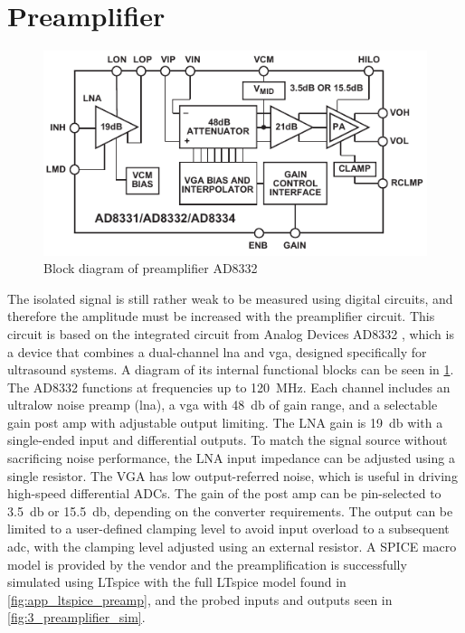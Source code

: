 \section{Preamplifier}
\begin{figure}[htbp]
	\centering
	\includegraphics[width=.8\textwidth]{Figures/3_ad8332_block.pdf}
	\caption[Block diagram of preamplifier AD8332]{Block diagram of preamplifier AD8332 \cite{AD8332}}
	\label{fig:3_preamplifier_block}
\end{figure}
The isolated signal is still rather weak to be measured using digital circuits, and therefore the amplitude must be increased with the preamplifier circuit. This circuit is based on the integrated circuit from Analog Devices AD8332 \cite{AD8332}, which is a device that combines a dual-channel \gls{lna} and \gls{vga}, designed specifically for ultrasound systems. A diagram of its internal functional blocks can be seen in \cref{fig:3_preamplifier_block}. The AD8332 functions at frequencies up to \qty{120}{\mega\hertz}. Each channel includes an ultralow noise preamp (\gls{lna}), a \gls{vga} with \qty{48}{\decibel} of gain range, and a selectable gain post amp with adjustable output limiting. The LNA gain is \qty{19}{\decibel} with a single-ended input and differential outputs. To match the signal source without sacrificing noise performance, the LNA input impedance can be adjusted using a single resistor. The VGA has low output-referred noise, which is useful in driving high-speed differential ADCs. The gain of the post amp can be pin-selected to \qty{3.5}{\decibel} or \qty{15.5}{\decibel}, depending on the converter requirements. The output can be limited to a user-defined clamping level to avoid input overload to a subsequent \gls{adc}, with the clamping level adjusted using an external resistor. A SPICE macro model is provided by the vendor and the preamplification is successfully simulated using LTspice with the full LTspice model found in \cref{fig:app_ltspice_preamp}, and the probed inputs and outputs seen in \cref{fig:3_preamplifier_sim}.

